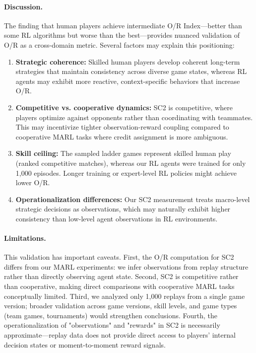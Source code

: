 \paragraph{Discussion.}
The finding that human players achieve intermediate O/R Index---better than some RL algorithms but worse than the best---provides nuanced validation of O/R as a cross-domain metric. Several factors may explain this positioning:

\begin{enumerate}
\item \textbf{Strategic coherence:} Skilled human players develop coherent long-term strategies that maintain consistency across diverse game states, whereas RL agents may exhibit more reactive, context-specific behaviors that increase O/R.

\item \textbf{Competitive vs. cooperative dynamics:} SC2 is competitive, where players optimize against opponents rather than coordinating with teammates. This may incentivize tighter observation-reward coupling compared to cooperative MARL tasks where credit assignment is more ambiguous.

\item \textbf{Skill ceiling:} The sampled ladder games represent skilled human play (ranked competitive matches), whereas our RL agents were trained for only 1,000 episodes. Longer training or expert-level RL policies might achieve lower O/R.

\item \textbf{Operationalization differences:} Our SC2 measurement treats macro-level strategic decisions as observations, which may naturally exhibit higher consistency than low-level agent observations in RL environments.
\end{enumerate}

\paragraph{Limitations.}
This validation has important caveats. First, the O/R computation for SC2 differs from our MARL experiments: we infer observations from replay structure rather than directly observing agent state. Second, SC2 is competitive rather than cooperative, making direct comparisons with cooperative MARL tasks conceptually limited. Third, we analyzed only 1,000 replays from a single game version; broader validation across game versions, skill levels, and game types (team games, tournaments) would strengthen conclusions. Fourth, the operationalization of "observations" and "rewards" in SC2 is necessarily approximate---replay data does not provide direct access to players' internal decision states or moment-to-moment reward signals.

